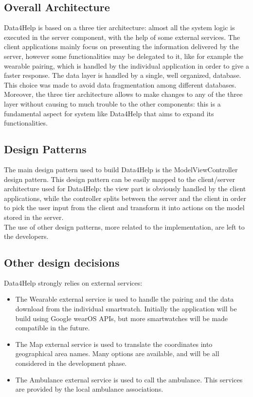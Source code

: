 \subsection{Overall Architecture}
Data4Help is based on a three tier architecture: almost all the system logic is executed in the server component, with the help of some external services.
The client applications mainly focus on presenting the information delivered by the server, however some functionalities may be delegated to it, like for example the wearable pairing, which is handled by the individual application in order to give a faster response.
The data layer is handled by a single, well organized, database. This choice was made to avoid data fragmentation among different databases.
\\

Moreover, the three tier architecture allows to make changes to any of the three layer without causing to much trouble to the other components: this is a fundamental aspect for system like Data4Help that aims to expand its functionalities.


\subsection{Design Patterns}
The main design pattern used to build Data4Help is the ModelViewController design pattern.
This design pattern can be easily mapped to the client/server architecture used for Data4Help: the 
view part is obviously handled by the client applications, while the controller splits between the server and the client in order to pick the user input from the client and transform it into actions on the model stored in the server.
\\
The use of other design patterns, more related to the implementation, are left to the developers. 

\subsection{Other design decisions}
Data4Help strongly relies on external services:
\begin{itemize}
\item The Wearable external service is used to handle the pairing and the data download from the individual smartwatch. Initially the application will be build using Google wearOS APIs, but more smartwatches will be made compatible in the future.
\item The Map external service is used to translate the coordinates into geographical area names. Many options are available, and will be all considered in the development phase.
\item The Ambulance external service is used to call the ambulance. This services are provided by the local ambulance associations.
\end{itemize}


